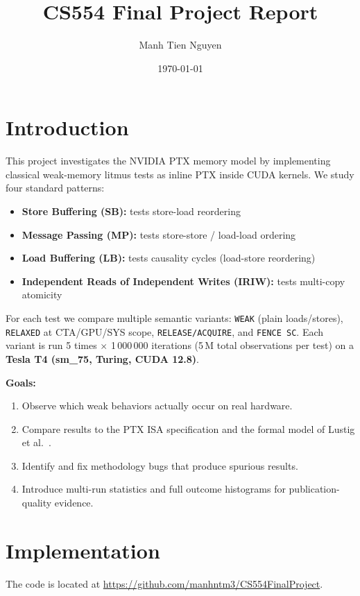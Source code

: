 \documentclass[a4paper]{article}
\title{CS554 Final Project Report}
\author{Manh Tien Nguyen}
\date{\today}
\begin{document}
\maketitle

\section{Introduction}

This project investigates the NVIDIA PTX memory model by implementing classical weak-memory litmus tests as inline PTX inside CUDA kernels.
We study four standard patterns:
\begin{itemize}
  \item \textbf{Store Buffering (SB):} tests store-load reordering
  \item \textbf{Message Passing (MP):} tests store-store / load-load ordering
  \item \textbf{Load Buffering (LB):} tests causality cycles (load-store reordering)
  \item \textbf{Independent Reads of Independent Writes (IRIW):} tests multi-copy atomicity
\end{itemize}

For each test we compare multiple semantic variants: \texttt{WEAK} (plain loads/stores), \texttt{RELAXED} at CTA/GPU/SYS scope, \texttt{RELEASE/ACQUIRE}, and \texttt{FENCE SC}.
Each variant is run 5 times $\times$ 1\,000\,000 iterations (5\,M total observations per test) on a \textbf{Tesla T4 (sm\_75, Turing, CUDA 12.8)}.

\bigskip\noindent\textbf{Goals:}
\begin{enumerate}
  \item Observe which weak behaviors actually occur on real hardware.
  \item Compare results to the PTX ISA specification and the formal model of Lustig et al.\ \cite{Lustig2019PTX}.
  \item Identify and fix methodology bugs that produce spurious results.
  \item Introduce multi-run statistics and full outcome histograms for publication-quality evidence.
\end{enumerate}

\section{Implementation}

The code is located at \url{https://github.com/manhntm3/CS554FinalProject}.
\end{document}

